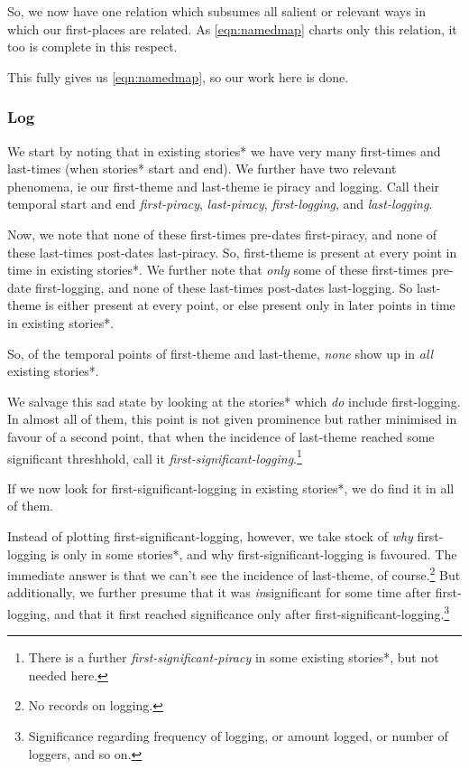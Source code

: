 \documentclass{amsart}
\newcommand{\ment}[1]{\textit{#1}} %
\theoremstyle{definition}
\theoremstyle{remark}
\begin{document}
			So, we now have one relation which subsumes all salient or relevant ways in which our first-places are related. As \ref{eqn:namedmap} charts only this relation, it too is complete in this respect.
			
			This fully gives us \ref{eqn:namedmap}, so our work here is done.
		\subsubsection{Log}
		\label{sss:log}
			We start by noting that in existing stories* we have very many first-times and last-times (when stories* start and end). We further have two relevant phenomena, ie our first-theme and last-theme ie piracy and logging. Call their temporal start and end \ment{first-piracy}, \ment{last-piracy}, \ment{first-logging}, and \ment{last-logging}.
			
			Now, we note that none of these first-times pre-dates first-piracy, and none of these last-times post-dates last-piracy. So, first-theme is present at every point in time in existing stories*. We further note that \emph{only} some of these first-times pre-date first-logging, and none of these last-times post-dates last-logging. So last-theme is either present at every point, or else present only in later points in time in existing stories*.
			
			So, of the temporal points of first-theme and last-theme, \emph{none} show up in \emph{all} existing stories*.
			
			We salvage this sad state by looking at the stories* which \emph{do} include first-logging. In almost all of them, this point is not given prominence but rather minimised in favour of a second point, that when the incidence of last-theme reached some significant threshhold, call it \ment{first-significant-logging}.\footnote{There is a further \ment{first-significant-piracy} in some existing stories*, but not needed here.}
			
			If we now look for first-significant-logging in existing stories*, we do find it in all of them.
			
			Instead of plotting first-significant-logging, however, we take stock of \emph{why} first-logging is only in some stories*, and why first-significant-logging is favoured. The immediate answer is that we can't see the incidence of last-theme, of course.\footnote{No records on logging.} But additionally, we further presume that it was \emph{in}significant for some time after first-logging, and that it first reached significance only after first-significant-logging.\footnote{Significance regarding frequency of logging, or amount logged, or number of loggers, and so on.}
			
\end{document}
